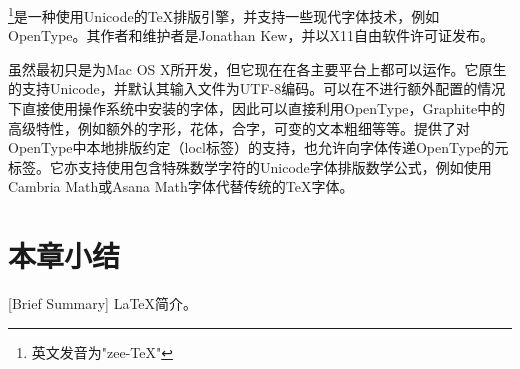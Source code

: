 \XeTeX{}\footnote{英文发音为"zee-\TeX{}"}是一种使用Unicode的\TeX{}排版引擎，并支持一些现代字体技术，例如OpenType。其作者和维护者是Jonathan Kew，并以X11自由软件许可证发布。

虽然\XeTeX{}最初只是为Mac OS X所开发，但它现在在各主要平台上都可以运作。它原生的支持Unicode，并默认其输入文件为UTF-8编码。\XeTeX{}可以在不进行额外配置的情况下直接使用操作系统中安装的字体，因此可以直接利用OpenType，Graphite中的高级特性，例如额外的字形，花体，合字，可变的文本粗细等等。\XeTeX{}提供了对OpenType中本地排版约定（locl标签）的支持，也允许向字体传递OpenType的元标签。它亦支持使用包含特殊数学字符的Unicode字体排版数学公式，例如使用Cambria Math或Asana Math字体代替传统的\TeX{}字体。

\section*{本章小结}[Brief Summary]
\LaTeX{}简介。